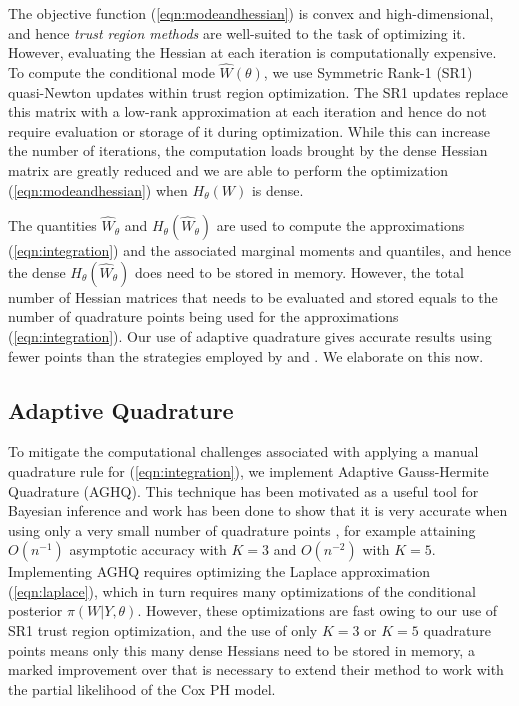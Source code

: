 \documentclass[ba]{imsart}
\begin{document}
The objective function (\ref{eqn:modeandhessian}) is convex and high-dimensional, and hence \emph{trust region methods} \citep{trustoptim} are well-suited to the task of optimizing it. However, evaluating the Hessian at each iteration is computationally expensive. To compute the conditional mode $\hat{W}(\theta)$, we use Symmetric Rank-1 (SR1) quasi-Newton updates within trust region optimization. The SR1 updates replace this matrix with a low-rank approximation at each iteration and hence do not require evaluation or storage of it during optimization. While this can increase the number of iterations, the computation loads brought by the dense Hessian matrix are greatly reduced and we are able to perform the optimization (\ref{eqn:modeandhessian}) when $H_{\theta}(W)$ is dense. 

The quantities $\widehat{W}_{\theta}$ and $H_{\theta}(\widehat{W}_{\theta})$ are used to compute the approximations (\ref{eqn:integration}) and the associated marginal moments and quantiles, and hence the dense $H_{\theta}(\widehat{W}_{\theta})$ does need to be stored in memory. However, the total number of Hessian matrices that needs to be evaluated and stored equals to the number of quadrature points being used for the approximations (\ref{eqn:integration}). Our use of adaptive quadrature gives accurate results using fewer points than the strategies employed by \cite{casecross} and \cite{inlacoxph}. We elaborate on this now.

\subsection{Adaptive Quadrature}

To mitigate the computational challenges associated with applying a manual quadrature rule for (\ref{eqn:integration}), we implement Adaptive Gauss-Hermite Quadrature (AGHQ). This technique has been motivated as a useful tool for Bayesian inference \citep{nayloradaptive} and work has been done to show that it is very accurate when using only a very small number of quadrature points \citep{adaptive_GH_1994,adaptive_GH_2020}, for example attaining $O(n^{-1})$ asymptotic accuracy with $K = 3$ and $O(n^{-2})$ with $K = 5$. Implementing AGHQ requires optimizing the Laplace approximation (\ref{eqn:laplace}), which in turn requires many optimizations of the conditional posterior $\pi(W|Y,\theta)$. However, these optimizations are fast owing to our use of SR1 trust region optimization, and the use of only $K = 3$ or $K = 5$ quadrature points means only this many dense Hessians need to be stored in memory, a marked improvement over \cite{casecross} that is necessary to extend their method to work with the partial likelihood of the Cox PH model.
\end{document}
